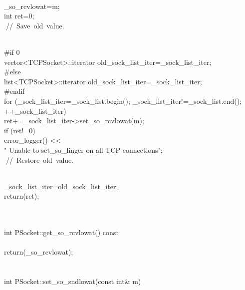 \documentclass{article}
\begin{document}
 {
\\
     _so_rcvlowat=m;
\\
         int ret=0;
\\
         
\hbox{// Save old value.}\strut\\
 #if 0
\\
         vector<TCPSocket>::iterator old_sock_list_iter=_sock_list_iter;
\\
 #else
\\
         list<TCPSocket>::iterator old_sock_list_iter=_sock_list_iter;
\\
 #endif
\\
     for (_sock_list_iter=_sock_list.begin(); _sock_list_iter!=_sock_list.end();
\\
          ++_sock_list_iter)
\\
         ret+=_sock_list_iter->set_so_rcvlowat(m);
\\
     if (ret!=0)
\\
         error_logger() << 
\\
                                 "    Unable to set_so_linger on all TCP connections\n";
\\
         
\hbox{// Restore old value.}\strut\\
         _sock_list_iter=old_sock_list_iter;
\\
     return(ret);
\\
 }
\\
 
\\
 int PSocket::get_so_rcvlowat() const
\\
 {
\\
         return(_so_rcvlowat);
\\
 }
\\
 
\\
 int PSocket::set_so_sndlowat(const int& m)
\\
\end{document}
